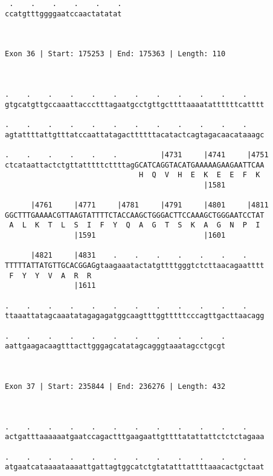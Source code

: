 \documentclass{article}
\begin{document}
\begin{Verbatim}
 .    .    .    .    .    .
ccatgtttggggaatccaactatatat
                           
                           
 
Exon 36 | Start: 175253 | End: 175363 | Length: 110



.    .    .    .    .    .    .    .    .    .    .    .    
gtgcatgttgccaaattaccctttagaatgcctgttgcttttaaaatattttttcatttt
                                                            
.    .    .    .    .    .    .    .    .    .    .    .    
agtattttattgtttatccaattatagacttttttacatactcagtagacaacataaagc
                                                            
.    .    .    .    .    .          |4731     |4741     |4751
ctcataattactctgttatttttcttttagGCATCAGGTACATGAAAAAGAAGAATTCAA
                               H  Q  V  H  E  K  E  E  F  K 
                                              |1581         
  
      |4761     |4771     |4781     |4791     |4801     |4811
GGCTTTGAAAACGTTAAGTATTTTCTACCAAGCTGGGACTTCCAAAGCTGGGAATCCTAT
 A  L  K  T  L  S  I  F  Y  Q  A  G  T  S  K  A  G  N  P  I 
                |1591                         |1601         
  
      |4821     |4831    .    .    .    .    .    .    .    
TTTTTATTATGTTGCACGGAGgtaagaaatactatgttttgggtctcttaacagaatttt
 F  Y  Y  V  A  R  R                                        
                |1611                                       
  
.    .    .    .    .    .    .    .    .    .    .    .    
ttaaattatagcaaatatagagagatggcaagtttggtttttcccagttgacttaacagg
                                                            
.    .    .    .    .    .    .    .    .    .    .
aattgaagacaagtttacttgggagcatatagcagggtaaatagcctgcgt
                                                   
                                                   
 
Exon 37 | Start: 235844 | End: 236276 | Length: 432



.    .    .    .    .    .    .    .    .    .    .    .    
actgatttaaaaaatgaatccagactttgaagaattgttttatattattctctctagaaa
                                                            
.    .    .    .    .    .    .    .    .    .    .    .    
atgaatcataaaataaaattgattagtggcatctgtatatttattttaaacactgctaat
                                                            

\end{Verbatim}
\end{document}
